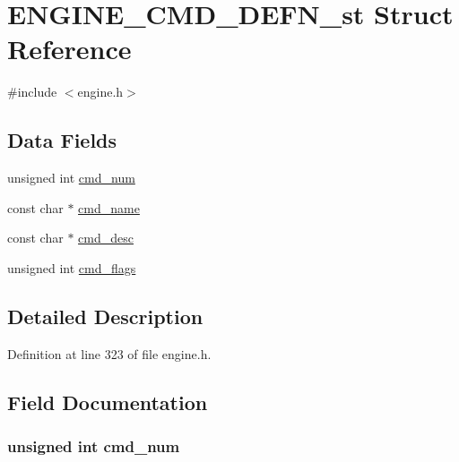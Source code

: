 \hypertarget{struct_e_n_g_i_n_e___c_m_d___d_e_f_n__st}{}\section{E\+N\+G\+I\+N\+E\+\_\+\+C\+M\+D\+\_\+\+D\+E\+F\+N\+\_\+st Struct Reference}
\label{struct_e_n_g_i_n_e___c_m_d___d_e_f_n__st}


{\ttfamily \#include $<$engine.\+h$>$}

\subsection*{Data Fields}
\begin{DoxyCompactItemize}
\item 
unsigned int \hyperlink{struct_e_n_g_i_n_e___c_m_d___d_e_f_n__st_a44907f0bbe6d70fbb63506327614ddc6}{cmd\+\_\+num}
\item 
const char $\ast$ \hyperlink{struct_e_n_g_i_n_e___c_m_d___d_e_f_n__st_a5bf0dad269963c63521e5d4d4f200171}{cmd\+\_\+name}
\item 
const char $\ast$ \hyperlink{struct_e_n_g_i_n_e___c_m_d___d_e_f_n__st_a5c2bb1b71312989ec0e42cd5ecdb78f6}{cmd\+\_\+desc}
\item 
unsigned int \hyperlink{struct_e_n_g_i_n_e___c_m_d___d_e_f_n__st_a5c4cbcd3ad212dd2f79706a4efd9b9c2}{cmd\+\_\+flags}
\end{DoxyCompactItemize}


\subsection{Detailed Description}


Definition at line 323 of file engine.\+h.



\subsection{Field Documentation}
\subsubsection[{\texorpdfstring{cmd\+\_\+num}{cmd_num}}]{\setlength{\rightskip}{0pt plus 5cm}unsigned int cmd\+\_\+num}\hypertarget{struct_e_n_g_i_n_e___c_m_d___d_e_f_n__st_a44907f0bbe6d70fbb63506327614ddc6}{}\label{struct_e_n_g_i_n_e___c_m_d___d_e_f_n__st_a44907f0bbe6d70fbb63506327614ddc6}


